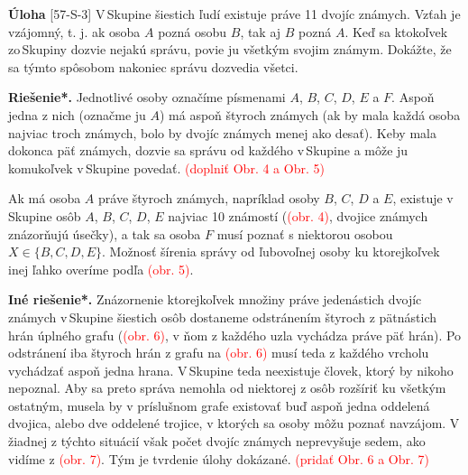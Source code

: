 \documentclass{article}
\newcommand{\rieh}{\textbf{Riešenie*.} }
\newcommand\todo[1]{\noindent\textcolor{red}{(#1)}}
\newcommand{\problem}[3]{
  \begin{tcolorbox}[breakable,notitle,boxrule=0pt,colback=light-gray,colframe=light-gray]
    \textbf{Úloha}
    [#1] #2
  \end{tcolorbox}
  \noindent#3
}
\begin{document}
\problem{57-S-3}{
V\,Skupine šiestich ľudí existuje práve 11 dvojíc známych. Vzťah \uv{poznať sa} je vzájomný, t. j. ak osoba $A$ pozná osobu $B$, tak aj $B$ pozná $A$. Keď sa ktokoľvek zo\,Skupiny dozvie nejakú správu, povie ju všetkým svojim známym. Dokážte, že sa týmto spôsobom nakoniec správu dozvedia všetci. 
}{
\rieh Jednotlivé osoby označíme písmenami $A$, $B$, $C$, $D$, $E$ a $F$. Aspoň jedna
z nich (označme ju $A$) má aspoň štyroch známych (ak by mala každá osoba najviac
troch známych, bolo by dvojíc známych menej ako desať). Keby mala dokonca päť známych, dozvie sa správu od každého v\,Skupine a môže ju komukoľvek v\,Skupine povedať.
\todo{doplniť Obr. 4  a Obr. 5}

Ak má osoba $A$ práve štyroch známych, napríklad osoby $B$, $C$, $D$ a $E$, existuje
v\,Skupine osôb $A$, $B$, $C$, $D$, $E$ najviac 10 známostí (\todo{obr. 4}, dvojice známych znázorňujú úsečky), a tak sa osoba $F$ musí poznať s niektorou osobou $X \in \{B, C, D, E\}$. Možnosť
šírenia správy od ľubovoľnej osoby ku ktorejkoľvek inej ľahko overíme podľa \todo{obr. 5}.

\textbf{Iné riešenie*.} Znázornenie ktorejkoľvek množiny práve jedenástich dvojíc známych
v\,Skupine šiestich osôb dostaneme odstránením štyroch z pätnástich hrán úplného grafu
(\todo{obr. 6}, v ňom z každého uzla vychádza práve päť hrán). Po odstránení iba štyroch hrán
z grafu na \todo{obr. 6} musí teda z každého vrcholu vychádzať aspoň jedna hrana. V\,Skupine
teda neexistuje človek, ktorý by nikoho nepoznal. Aby sa preto správa nemohla od
niektorej z osôb rozšíriť ku všetkým ostatným, musela by v príslušnom grafe existovať
buď aspoň jedna oddelená dvojica, alebo dve oddelené trojice, v ktorých sa osoby môžu
poznať navzájom. V žiadnej z týchto situácií však počet dvojíc známych neprevyšuje
sedem, ako vidíme z \todo{obr. 7}. Tým je tvrdenie úlohy dokázané. 
\todo{pridať  Obr. 6 a  Obr. 7}
}
\end{document}
